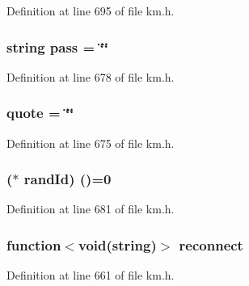 Definition at line 695 of file km.\+h.

\subsubsection[{\texorpdfstring{pass}{pass}}]{\setlength{\rightskip}{0pt plus 5cm}string pass = \char`\"{}\char`\"{}}\hypertarget{class_k_1_1_gw_a2805cc9b0dd93ef48a266ab19ebfd7c1}{}\label{class_k_1_1_gw_a2805cc9b0dd93ef48a266ab19ebfd7c1}


Definition at line 678 of file km.\+h.

\subsubsection[{\texorpdfstring{quote}{quote}}]{ quote = \char`\"{}\char`\"{}}\hypertarget{class_k_1_1_gw_abb05d77de0b838cdc580fe5759070aad}{}\label{class_k_1_1_gw_abb05d77de0b838cdc580fe5759070aad}


Definition at line 675 of file km.\+h.

\subsubsection[{\texorpdfstring{rand\+Id}{randId}}]{($\ast$ rand\+Id) ()=0}\hypertarget{class_k_1_1_gw_ae3eceb5a8284748fe41ebb9e201cffbf}{}\label{class_k_1_1_gw_ae3eceb5a8284748fe41ebb9e201cffbf}


Definition at line 681 of file km.\+h.

\subsubsection[{\texorpdfstring{reconnect}{reconnect}}]{\setlength{\rightskip}{0pt plus 5cm}function$<$void(string)$>$ reconnect}\hypertarget{class_k_1_1_gw_acedf7f89824adaf984f2ff0cbb29961a}{}\label{class_k_1_1_gw_acedf7f89824adaf984f2ff0cbb29961a}


Definition at line 661 of file km.\+h.

